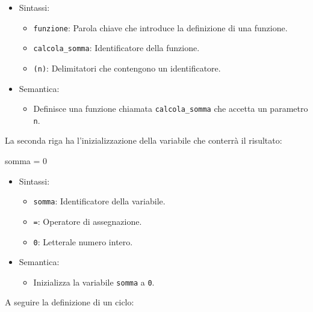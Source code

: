 \documentclass[
  letterpaper,
]{scrbook}
\newenvironment{Shaded}{\begin{snugshade}}{\end{snugshade}}
\newcommand{\NormalTok}[1]{\textcolor[rgb]{0.00,0.23,0.31}{#1}}
\providecommand{\tightlist}{%
  \setlength{\itemsep}{0pt}\setlength{\parskip}{0pt}}\usepackage{longtable,booktabs,array}
\begin{document}
\begin{itemize}
\tightlist
\item
  Sintassi:

  \begin{itemize}
  \tightlist
  \item
    \texttt{funzione}: Parola chiave che introduce la definizione di una
    funzione.
  \item
    \texttt{calcola\_somma}: Identificatore della funzione.
  \item
    \texttt{(n)}: Delimitatori che contengono un identificatore.
  \end{itemize}
\item
  Semantica:

  \begin{itemize}
  \tightlist
  \item
    Definisce una funzione chiamata \texttt{calcola\_somma} che accetta
    un parametro \texttt{n}.
  \end{itemize}
\end{itemize}

La seconda riga ha l'inizializzazione della variabile che conterrà il
risultato:

\begin{Shaded}
\begin{Highlighting}[]
\NormalTok{somma = 0}
\end{Highlighting}
\end{Shaded}

\begin{itemize}
\tightlist
\item
  Sintassi:

  \begin{itemize}
  \tightlist
  \item
    \texttt{somma}: Identificatore della variabile.
  \item
    \texttt{=}: Operatore di assegnazione.
  \item
    \texttt{0}: Letterale numero intero.
  \end{itemize}
\item
  Semantica:

  \begin{itemize}
  \tightlist
  \item
    Inizializza la variabile \texttt{somma} a \texttt{0}.
  \end{itemize}
\end{itemize}

A seguire la definizione di un ciclo:
\end{document}
